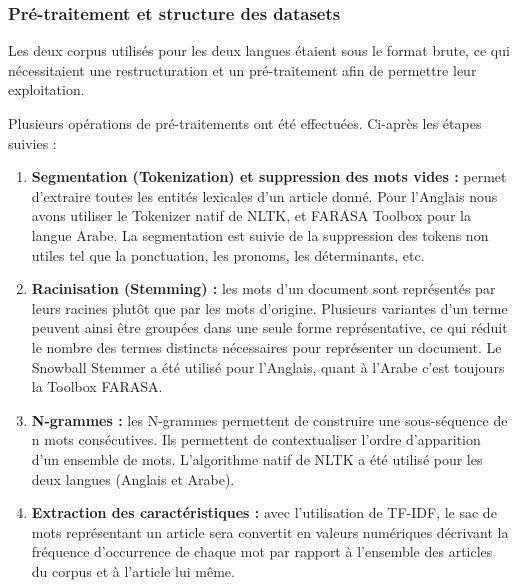         \subsubsection{Pré-traitement et structure des datasets}
            Les deux corpus utilisés pour les deux langues étaient sous le format brute, ce qui nécessitaient une restructuration et un pré-traitement afin de permettre leur exploitation.  

            Plusieurs opérations de pré-traitements ont été effectuées. Ci-après les étapes suivies :
            \begin{enumerate}
                \item{\textbf{Segmentation (Tokenization) et suppression des mots vides :} }permet d'extraire toutes les entités lexicales d'un article donné. Pour l'Anglais nous avons utiliser le Tokenizer natif de NLTK, et FARASA Toolbox pour la langue Arabe. La segmentation est suivie de la suppression des tokens non utiles tel que la ponctuation, les pronoms, les déterminants, etc.\\  
                
                \item{\textbf{Racinisation (Stemming) :} }les mots d'un document sont représentés par leurs racines plutôt que par les mots d'origine. Plusieurs variantes d'un terme peuvent ainsi être groupées dans une seule forme représentative, ce qui réduit le nombre des termes distincts nécessaires pour représenter un document. Le Snowball Stemmer a été utilisé pour l'Anglais, quant à l'Arabe c'est toujours la Toolbox FARASA.\\

                \item{\textbf{N-grammes :} }les N-grammes permettent de construire une sous-séquence de n mots consécutives. Ils permettent de contextualiser l'ordre d'apparition d'un ensemble de mots. L'algorithme natif de NLTK a été utilisé pour les deux langues (Anglais et Arabe).\\ 
                
                \item{\textbf{Extraction des caractéristiques :} }avec l'utilisation de TF-IDF, le sac de mots représentant un article sera convertit en valeurs numériques décrivant la fréquence d'occurrence de chaque mot par rapport à l'ensemble des articles du corpus et à l'article lui même.\\
            \end{enumerate}

